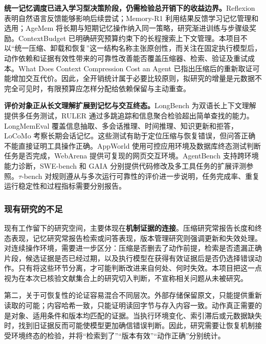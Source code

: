 \textbf{统一记忆调度已进入学习型决策阶段，仍需检验总开销下的收益边界。}Reflexion 表明自然语言反馈能够影响后续尝试\cite{reflexion}；Memory-R1 利用结果反馈学习记忆管理和选用\cite{memoryr1}；AgeMem 将长期与短期记忆操作纳入同一策略，研究渐进训练与步骤级奖励\cite{agemem}。ContextBudget 已明确研究预算约束下的长程搜索上下文管理\cite{contextbudget}。本项目不以“统一压缩、卸载和恢复”这一结构名称主张原创性，而关注在固定执行模型后，动作依赖和证据有效性带来的可靠性改善能否覆盖压缩器、检索、验证及重试成本。What Does Context Compression Cost an Agent 已指出压缩后的重新取证可能增加交互代价\cite{compressioncost}。因此，全开销统计属于必要比较原则，拟研究的增量是元数据不完全可见时，有限预算应怎样分配给依赖保留与主动重查。

\textbf{评价对象正从长文理解扩展到记忆与交互终态。}LongBench 为双语长上下文理解提供多任务测试\cite{longbench}，RULER 通过多跳追踪和信息聚合检验超出简单查找的能力\cite{ruler}。LongMemEval 覆盖信息抽取、多会话推理、时间推理、知识更新和拒答\cite{longmemeval}，LoCoMo 考察长期会话记忆\cite{locomo}。这些测试有助于定位压缩与恢复错误，但问答正确不能直接证明工具操作正确。AppWorld 使用可控应用环境及数据库终态测试判断任务是否完成\cite{appworld}，WebArena 提供可复现的网页交互环境\cite{webarena}。AgentBench 支持跨环境能力诊断\cite{agentbench}，SWE-bench 和 GAIA 分别提供代码修改及多工具任务的扩展评测参照\cite{swebench,gaia}。\(\tau\)-bench 对规则遵从与多次运行可靠性的评价\cite{taubench}进一步说明，任务完成率、重复运行稳定性和过程指标需要分别报告。

\subsubsection{现有研究的不足}
现有工作留下的研究空间，主要体现在\textbf{机制证据的连接}。压缩研究常报告长度和终态表现，记忆研究常报告检索或问答表现，版本管理研究则强调更新和失效处理。对连续操作环境，需要进一步区分：压缩是否删去了动作前提，检索是否遗漏正确片段，候选证据是否已经过期，以及执行模型在获得有效证据后是否仍选择错误动作。只有将这些环节分离，才可能判断改进来自何处、何时失效。本项目把这一点视为在本次已核验文献集合上的研究切入判断，不宣称相关问题从未被研究。

第二，关于可恢复性的论证容易混合不同层次。外部存储保留原文，只能提供重新读取的可能；内容哈希一致，只能证明读回字节与存入内容一致。动作真正需要的是对象、适用条件和版本均匹配的证据。当执行环境变化、索引滞后或元数据缺失时，找到旧证据反而可能使模型更加确信错误判断。因此，研究需要让恢复机制接受环境终态的检验，并将“检索到了”“版本有效”“动作正确”分别统计。

